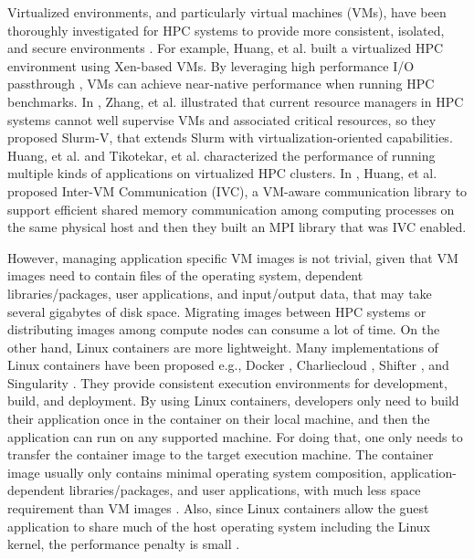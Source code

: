 Virtualized environments, and particularly virtual machines (VMs), have been thoroughly investigated for HPC systems to provide more consistent, isolated, and secure environments \cite{vallee2008system, reuther2012hpc}. For example, Huang, et al. \cite{huang2006case} built a virtualized HPC environment using Xen-based VMs. By leveraging high performance I/O passthrough \cite{liu2006high}, VMs can achieve near-native performance when running HPC benchmarks. In \cite{zhang2016slurm}, Zhang, et al. illustrated that current resource managers in HPC systems cannot well supervise VMs and associated critical resources, so they proposed Slurm-V, that extends Slurm with virtualization-oriented capabilities. Huang, et al. and Tikotekar, et al. \cite{gugnani2016performance, tikotekar2008analysis} characterized the performance  of running multiple kinds of applications on virtualized HPC clusters. In \cite{huang2007virtual}, Huang, et al. proposed Inter-VM Communication (IVC), a VM-aware communication library to support efficient shared memory communication among computing processes on the same physical host and then they built an MPI library that was IVC enabled.

However, managing application specific VM images is not trivial, given that VM images need to contain files of the operating system, dependent libraries/packages, user applications, and input/output data, that may take several gigabytes of disk space. Migrating images between HPC systems or distributing images among compute nodes can consume a lot of time. On the other hand, Linux containers are more lightweight. Many implementations of Linux containers have been proposed e.g., Docker \cite{Docker}, Charliecloud \cite{priedhorsky2016charliecloud}, Shifter \cite{jacobsen2015contain}, and Singularity \cite{kurtzer_2016_60736}. They provide consistent execution environments for development, build, and deployment. By using Linux containers, developers only need to build their application once in the container on their local machine, and then the application can run on any supported machine. For doing that, one only needs to transfer the container image to the target execution machine. The container image usually only contains minimal operating system composition, application-dependent libraries/packages, and user applications, with much less space requirement than VM images \cite{boettiger2015introduction}. Also, since  Linux containers allow the guest application to share much of the host operating system including the Linux kernel, the performance penalty is small \cite{merkel2014docker, ruan2016performance}.



